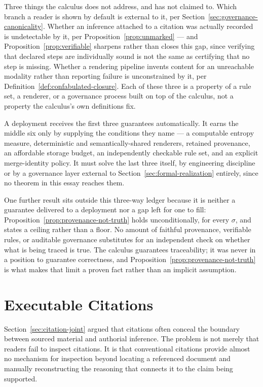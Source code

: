 \documentclass[11pt]{article}
\theoremstyle{definition}
\begin{document}
Three things the calculus does not address, and has not claimed to. Which branch a reader is shown by default is external to it, per Section~\ref{sec:governance-canonicality}. Whether an inference attached to a citation was actually recorded is undetectable by it, per Proposition~\ref{prop:unmarked} --- and Proposition~\ref{prop:verifiable} sharpens rather than closes this gap, since verifying that declared steps are individually sound is not the same as certifying that no step is missing. Whether a rendering pipeline invents content for an unreachable modality rather than reporting failure is unconstrained by it, per Definition~\ref{def:confabulated-closure}. Each of these three is a property of a rule set, a renderer, or a governance process built on top of the calculus, not a property the calculus's own definitions fix.

A deployment receives the first three guarantees automatically. It earns the middle six only by supplying the conditions they name --- a computable entropy measure, deterministic and semantically-shared renderers, retained provenance, an affordable storage budget, an independently checkable rule set, and an explicit merge-identity policy. It must solve the last three itself, by engineering discipline or by a governance layer external to Section~\ref{sec:formal-realization} entirely, since no theorem in this essay reaches them.

One further result sits outside this three-way ledger because it is neither a guarantee delivered to a deployment nor a gap left for one to fill: Proposition~\ref{prop:provenance-not-truth} holds unconditionally, for every $\sigma$, and states a ceiling rather than a floor. No amount of faithful provenance, verifiable rules, or auditable governance substitutes for an independent check on whether what is being traced is true. The calculus guarantees traceability; it was never in a position to guarantee correctness, and Proposition~\ref{prop:provenance-not-truth} is what makes that limit a proven fact rather than an implicit assumption.

\section{Executable Citations}
\label{sec:executable-citations}

Section~\ref{sec:citation-joint} argued that citations often conceal the boundary between sourced material and authorial inference. The problem is not merely that readers fail to inspect citations. It is that conventional citations provide almost no mechanism for inspection beyond locating a referenced document and manually reconstructing the reasoning that connects it to the claim being supported.
\end{document}
